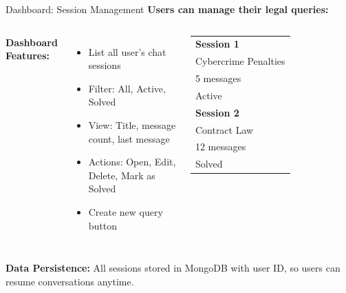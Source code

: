 \documentclass[11pt,aspectratio=16:9]{beamer}
\begin{document}
\begin{frame}{Dashboard: Session Management}
    \textbf{Users can manage their legal queries:}
    
    \begin{columns}
        \textbf{Dashboard Features:}
        \begin{itemize}
            \item List all user's chat sessions
            \item Filter: All, Active, Solved
            \item View: Title, message count, last message
            \item Actions: Open, Edit, Delete, Mark as Solved
            \item Create new query button
        \end{itemize}
        
        \small
        \begin{tabular}{|l|}
            \hline
            \textbf{Session 1} \\
            Cybercrime Penalties \\
            5 messages \\
            Active \\
            \hline
            \textbf{Session 2} \\
            Contract Law \\
            12 messages \\
            Solved \\
            \hline
        \end{tabular}
    \end{columns}
    
    \vspace{0.8cm}
    
    \textbf{Data Persistence:} All sessions stored in MongoDB with user ID, so users can resume conversations anytime.
\end{frame}
\end{document}
